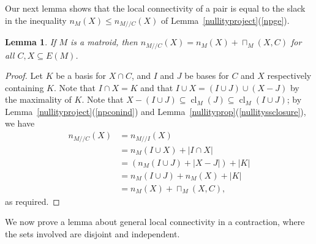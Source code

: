 \documentclass{amsart}
\theoremstyle{plain}
\newtheorem{lemma}[theorem]{Lemma}
\theoremstyle{definition}
\newcommand{\dcon}{/ \!\! /}
\DeclareMathOperator{\cl}{cl}
\renewcommand{\le}{\leqslant}
\renewcommand{\ss}{\subseteq}
\begin{document}
Our next lemma shows that the local connectivity of a pair is equal to the slack in the inequality $n_{M}(X) \le n_{M \dcon C}(X)$
of Lemma~\ref{nullityproject}(\ref{npge}). 
\begin{lemma}\label{nullitycontractadd}
  If $M$ is a matroid, then $n_{M \dcon C}(X) = n_M(X) + \sqcap_M(X,C)$ for all $C, X \ss E(M)$.
\end{lemma}
\begin{proof}
  Let $K$ be a basis for $X \cap C$, and $I$ and $J$ be bases for $C$ and $X$ respectively containing $K$. 
  Note that $I \cap X = K$ and that $I \cup X = (I \cup J) \cup (X - J)$ by the maximality of $K$. 
  Note that $X - (I \cup J) \ss \cl_M(J) \ss \cl_M(I \cup J)$;
  by Lemma~\ref{nullityproject}(\ref{npconind}) and Lemma~\ref{nullityprop}(\ref{nullityssclosure}), we have
  \begin{align*}
    n_{M \dcon C}(X) &= n_{M \dcon I}(X) \\
    &= n_M(I \cup X) + |I \cap X| \\
    &= (n_M(I \cup J) + |X - J|) + |K| \\
    &= n_M(I \cup J) + n_M(X) + |K| \\
    &= n_M(X) + \sqcap_M(X,C),
  \end{align*}
  as required. 
\end{proof}

We now prove a lemma about general local connectivity in a contraction, where the sets involved are disjoint and independent. 
\end{document}
